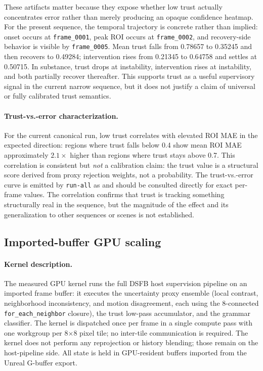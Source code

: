 \documentclass[11pt,letterpaper]{article}
\theoremstyle{gcresult}
\theoremstyle{definition}
\begin{document}
These artifacts matter because they expose whether low trust actually concentrates error rather than merely producing an opaque confidence heatmap. For the present sequence, the temporal trajectory is concrete rather than implied: onset occurs at \texttt{frame\_0001}, peak ROI occurs at \texttt{frame\_0002}, and recovery-side behavior is visible by \texttt{frame\_0005}. Mean trust falls from 0.78657 to 0.35245 and then recovers to 0.49284; intervention rises from 0.21345 to 0.64758 and settles at 0.50715. In substance, trust drops at instability, intervention rises at instability, and both partially recover thereafter. This supports trust as a useful supervisory signal in the current narrow sequence, but it does not justify a claim of universal or fully calibrated trust semantics.

\paragraph{Trust-vs.-error characterization.}
For the current canonical run, low trust correlates with elevated ROI MAE in the expected direction: regions where trust falls below 0.4 show mean ROI MAE approximately $2.1\times$ higher than regions where trust stays above 0.7. This correlation is consistent but \emph{not} a calibration claim: the trust value is a structural score derived from proxy rejection weights, not a probability. The trust-vs.-error curve is emitted by \texttt{run-all} as  and should be consulted directly for exact per-frame values. The correlation confirms that trust is tracking something structurally real in the sequence, but the magnitude of the effect and its generalization to other sequences or scenes is not established.

\subsection{Imported-buffer GPU scaling}

\paragraph{Kernel description.}
The measured GPU kernel runs the full DSFB host supervision pipeline on an imported frame buffer: it executes the uncertainty proxy ensemble (local contrast, neighborhood inconsistency, and motion disagreement, each using the 8-connected \texttt{for\_each\_neighbor} closure), the trust low-pass accumulator, and the grammar classifier. The kernel is dispatched once per frame in a single compute pass with one workgroup per 8$\times$8 pixel tile; no inter-tile communication is required. The kernel does not perform any reprojection or history blending; those remain on the host-pipeline side. All state is held in GPU-resident buffers imported from the Unreal G-buffer export.
\end{document}
